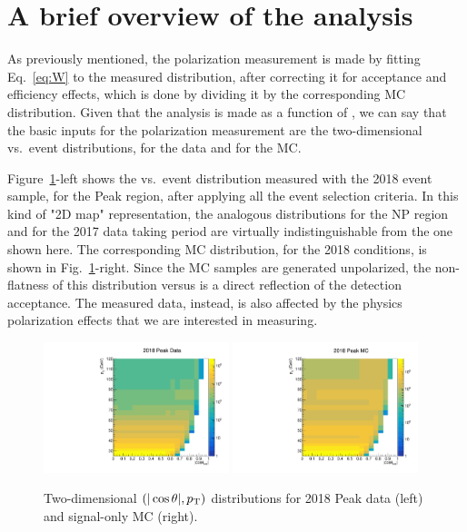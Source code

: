 \section{A brief overview of the analysis}
\label{sec:overview}

As previously mentioned, the polarization measurement is made by fitting Eq.~\ref{eq:W}
to the measured \abscosth distribution, after correcting it for acceptance and efficiency effects, 
which is done by dividing it by the corresponding MC distribution.
Given that the analysis is made as a function of \pt, we can say that the basic inputs for the
polarization measurement are the two-dimensional \abscosth vs.\ \pt event distributions,
for the data and for the MC.

Figure~\ref{fig:2Dmaps_data_vs_MC}-left shows the \jpsi \abscosth vs.\ \pt event distribution 
measured with the 2018 event sample, for the Peak region,
after applying all the event selection criteria. 
In this kind of "2D map" representation, 
the analogous distributions for the NP region and for the 2017 data taking period
are virtually indistinguishable from the one shown here.
%
The corresponding MC distribution, for the 2018 conditions,
is shown in Fig.~\ref{fig:2Dmaps_data_vs_MC}-right. 
Since the MC samples are generated unpolarized, 
the non-flatness of this distribution versus \abscosth is a direct reflection of the detection acceptance.
The measured data, instead, is also affected by the physics polarization effects
that we are interested in measuring.

\begin{figure}[h]
\centering
\includegraphics[width=0.48\textwidth]{Figures/chapter3/data_2d_plot.pdf}
\includegraphics[width=0.48\textwidth]{Figures/chapter3/mc_2d_plot.pdf}
\caption{Two-dimensional \jpsi $(|\cos\theta|,p_\text{T})$ distributions for 2018 
Peak data (left) and signal-only MC (right).}
\label{fig:2Dmaps_data_vs_MC}
\end{figure}

